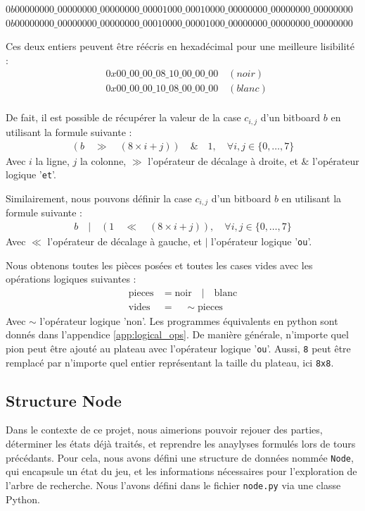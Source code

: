 \begin{center}
$0b00000000\_00000000\_00000000\_00001000\_00010000\_00000000\_00000000\_00000000$ \\
$0b00000000\_00000000\_00000000\_00010000\_00001000\_00000000\_00000000\_00000000$ \\
\end{center}
Ces deux entiers peuvent être réécris en hexadécimal pour une meilleure lisibilité :
\begin{align*}
    &0x00\_00\_00\_08\_10\_00\_00\_00 \quad (noir)\\
    &0x00\_00\_00\_10\_08\_00\_00\_00 \quad (blanc)\\
\end{align*}

De fait, il est possible de récupérer la valeur de la case $c_{i,j}$ d'un bitboard $b$ en utilisant la formule suivante : 
\begin{align*}
    (b\quad \gg\quad (8\times i+j))\quad \&\quad 1, \quad \forall i,j \in \{0,\dots,7\}
\end{align*}
Avec $i$ la ligne, $j$ la colonne, $\gg$ l'opérateur de décalage à droite, et $\&$ l'opérateur logique '\texttt{et}'.

Similairement, nous pouvons définir la case $c_{i,j}$ d'un bitboard $b$ en utilisant la formule suivante :
\begin{align*}
    b\quad |\quad (1\quad \ll\quad (8\times i+j)), \quad \forall i,j \in \{0,\dots,7\}
\end{align*}
Avec $\ll$ l'opérateur de décalage à gauche, et $|$ l'opérateur logique '\texttt{ou}'.

Nous obtenons toutes les pièces posées et toutes les cases vides avec les opérations logiques suivantes :
\begin{align*}
    \text{pieces} &= \text{noir} \quad | \quad \text{blanc} \\
    \text{vides} &= \quad\sim\text{pieces}
\end{align*}
Avec $\sim$ l'opérateur logique 'non'. Les programmes équivalents en python sont donnés dans l'appendice \ref{app:logical_ops}. De manière générale, n'importe quel pion peut être ajouté au plateau avec l'opérateur logique '\texttt{ou}'. Aussi, \texttt{8} peut être remplacé par n'importe quel entier représentant la taille du plateau, ici \texttt{8x8}.

\subsection{Structure Node}
\label{subsec:node}
Dans le contexte de ce projet, nous aimerions pouvoir rejouer des parties, déterminer les états déjà traités, et reprendre les anaylyses formulés lors de tours précédants. Pour cela, nous avons défini une structure de données nommée \texttt{Node}, qui encapsule un état du jeu, et les informations nécessaires pour l'exploration de l'arbre de recherche. Nous l'avons défini dans le fichier \texttt{node.py} via une classe Python. \vskip 0.5cm

